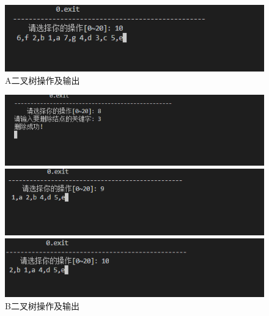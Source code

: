 \documentclass[supercite]{Experimental_Report}
\theoremstyle{definition}
\begin{document}
\begin{itemize}
	      \newpage
	      \begin{figure}[htbp]
		      \centering
		      \begin{minipage}{0.9\linewidth}
			      \centering
			      \includegraphics[width=0.9\linewidth]{images/test-105.png}
		      \end{minipage}
		      \caption{A二叉树操作及输出}
		      \label{fig2-21}
	      \end{figure}
	      \begin{figure}[htbp]
		      \centering
		      \begin{minipage}{0.9\linewidth}
			      \centering
			      \includegraphics[width=0.9\linewidth]{images/test-106.png}
		      \end{minipage}
		      \begin{minipage}{0.9\linewidth}
			      \centering
			      \includegraphics[width=0.9\linewidth]{images/test-107.png}
		      \end{minipage}
		      \begin{minipage}{0.9\linewidth}
			      \centering
			      \includegraphics[width=0.9\linewidth]{images/test-108.png}
		      \end{minipage}
		      \caption{B二叉树操作及输出}
		      \label{fig2-22}
	      \end{figure}
\end{itemize}
\end{document}
